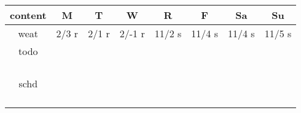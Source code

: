 \begin{columns}
\begin{column}{0.5\linewidth}
\begin{table}[ht!]
\label{fig:calendar}
\begin{center}
\begin{tabular}
{ | c || c | c | c | c | c | c | c |}
\hline
  \textbf{\small content} & {\small \bf M} & {\small \bf T} & {\small
    \bf W} & {\small \bf R} & {\small \bf F} & {\small \bf Sa} &
         {\small \bf Su} \\
  \hline
  \small weat  &\tiny 2/3 r &\tiny 2/1 r &\tiny 2/-1 r &\tiny 11/2 s  &\tiny 11/4 s   &\tiny  11/4 s &\tiny 11/5 s \\
  \hline
  \small todo  &\small &\small &\small &\small &\small &\small
  &\small  \\
  \small       &\small &\small &\small &\small &\small &\small
  &\small  \\
  \small       &\small &\small &\small &\small &\small &\small
  &\small  \\
  \small       &\small &\small &\small &\small &\small &\small
  &\small  \\
  \small       &\small &\small &\small &\small &\small &\small
  &\small  \\
  \hline
  \small schd  &\small &\small &\small &\small &\small &\small &\small  \\
  \small     &\small &\small &\small &\small &\small &\small  &\small
  \\
  \small      &\small &\small &\small &\small &\small &\small  &\small
  \\
  \small    &\small &\small &\small &\small &\small &\small  &\small
  \\
  \small     &\small &\small &\small &\small &\small &\small &\small
  \\
  \hline
\end{tabular}
\end{center}
\end{table}

  \end{column}





\end{columns}
